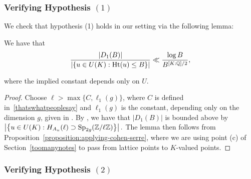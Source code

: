 \subsubsection{Verifying Hypothesis $(1)$}
We check that hypothesis (1) holds in our setting via the following lemma:
	\begin{lemma}\label{lemma:davide-1}
		 We have that
		 \begin{align}
			 \label{equation:bound-d1}
			\frac{|D_1(B)|}{|\{u \in U(K) : \operatorname{Ht}(u) \le B\}|} \ll \frac{\log B}{B^{[K:\mathbb Q]/2}},
		 \end{align}
		
        where the implied constant depends only on $U$.
	\end{lemma}
	\begin{proof}
Choose $\ell > \max\{C, \ell_1(g)\}$, where $C$ is defined in~\eqref{thatswhatpeoplesay} and $\ell_1(g)$ is the constant, depending only on the dimension $g$, given in
\cite[Proposition 4]{ellenbergEHK:non-simple-abelian-varieties-in-a-family}.
By
\cite[Proposition 4]{ellenbergEHK:non-simple-abelian-varieties-in-a-family}, we have that $|D_1(B)|$ is bounded above by $\left| \left\{ u \in U(K) : H_{A_u}(\ell) \supset \operatorname{Sp}_{2g}(\mathbb Z/\ell \mathbb Z) \right\}\right|.$
The lemma then follows from
Proposition~\ref{proposition:applying-cohen-serre},
where we are using point (c) of Section~\ref{toomanynotes} to pass from lattice points to $K$-valued points.
	\end{proof}

\subsubsection{Verifying Hypothesis $(2)$}

